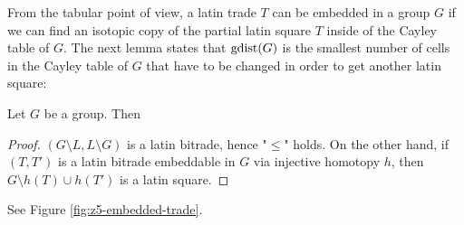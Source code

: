 From the tabular point of view, a latin trade $T$ can be embedded in a group $G$ if we can find an isotopic copy of the partial latin square $T$ inside of the Cayley table of $G$. The next lemma states that $\mathop{\mathrm{gdist}}(G)$ is the smallest number of cells in the Cayley table of $G$ that have to be changed in order to get another latin square:

\begin{lem}
Let $G$ be a group. Then
%
\end{lem}
\begin{proof}
$(G \setminus L, L \setminus G)$ is a latin bitrade, hence "$\leq$" holds. On the other hand, if $(T,T')$ is a latin bitrade embeddable in $G$ via injective homotopy $h$, then $G \setminus h(T) \cup h(T')$ is a latin square.
\end{proof}

\begin{exmp}
See Figure \ref{fig:z5-embedded-trade}.
\end{exmp}%

